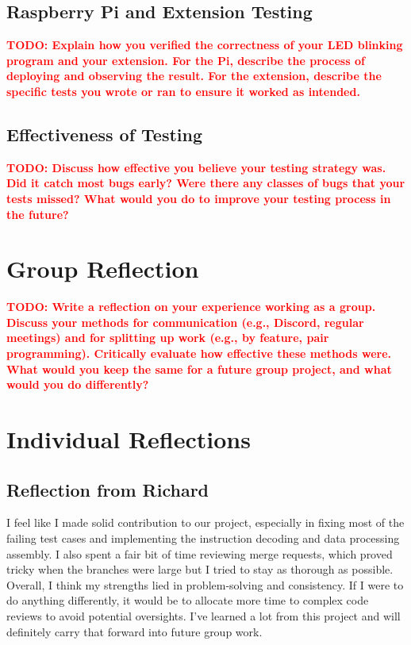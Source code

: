 \documentclass[11pt]{article}
\newcommand{\todo}[1]{\textcolor{red}{\textbf{TODO: #1}}}
\begin{document}
\subsection{Raspberry Pi and Extension Testing}
\todo{Explain how you verified the correctness of your LED blinking program and your extension. For the Pi, describe the process of deploying and observing the result. For the extension, describe the specific tests you wrote or ran to ensure it worked as intended.}

\subsection{Effectiveness of Testing}
\todo{Discuss how effective you believe your testing strategy was. Did it catch most bugs early? Were there any classes of bugs that your tests missed? What would you do to improve your testing process in the future?}


\section{Group Reflection}
\todo{Write a reflection on your experience working as a group. Discuss your methods for communication (e.g., Discord, regular meetings) and for splitting up work (e.g., by feature, pair programming). Critically evaluate how effective these methods were. What would you keep the same for a future group project, and what would you do differently?}


\section{Individual Reflections}
\subsection{Reflection from Richard}
I feel like I made solid contribution to our project, especially in fixing most of the failing test cases and implementing the 
instruction decoding and data processing assembly. I also spent a fair bit of time reviewing merge requests, which proved tricky 
when the branches were large but I tried to stay as thorough as possible. Overall, I think my strengths lied in problem-solving and 
consistency. If I were to do anything differently, it would be to allocate more time to complex code 
reviews to avoid potential oversights. I've learned a lot from this project and will definitely carry that forward into future group work.
\end{document}
